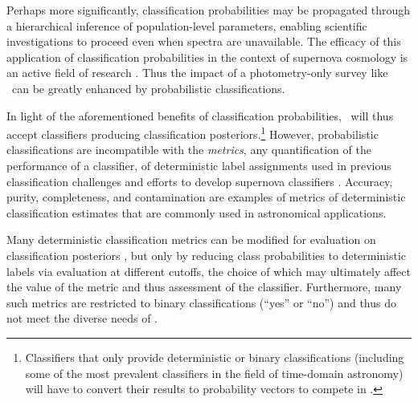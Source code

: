 Perhaps more significantly, classification probabilities may be propagated through a hierarchical inference of population-level parameters, enabling scientific investigations to proceed even when spectra are unavailable.
The efficacy of this application of classification probabilities in the context of supernova cosmology is an active field of research \citep[Malz, Peters, and Hlo\v{z}ek in prep]{rubin_unity:_2015, roberts_zbeams:_2017, jones_measuring_2018}.
Thus the impact of a photometry-only survey like \lsst\ can be greatly enhanced by probabilistic classifications.

In light of the aforementioned benefits of classification probabilities, \plasticc\ will thus accept classifiers producing classification posteriors.\footnote{Classifiers that only provide deterministic or binary classifications (including some of the most prevalent classifiers in the field of time-domain astronomy) will have to convert their results to probability vectors to compete in \plasticc.}
However, probabilistic classifications are incompatible with the \textit{metrics}, any quantification of the performance of a classifier, of deterministic label assignments used in previous classification challenges \citep{kessler_supernova_2010, kessler_results_2010} and efforts to develop supernova classifiers \citep{narayan_machine_2018}.
Accuracy, purity, completeness, and contamination are examples of metrics of deterministic classification estimates that are commonly used in astronomical applications.

Many deterministic classification metrics can be modified for evaluation on classification posteriors \citep{gieseke_detecting_2010, lochner_photometric_2016, moller_photometric_2016, hon_deep_2017, hon_detecting_2018}, but only by reducing class probabilities to deterministic labels via evaluation at different cutoffs, the choice of which may ultimately affect the value of the metric and thus assessment of the classifier.
Furthermore, many such metrics are restricted to binary classifications (``yes'' or ``no'') and thus do not meet the diverse needs of \plasticc.

